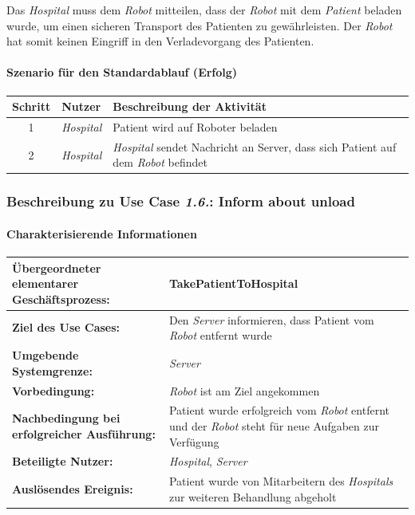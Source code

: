 				Das \emph{Hospital} muss dem \emph{Robot} mitteilen, dass der \emph{Robot} mit dem \emph{Patient} beladen wurde, um einen sicheren Transport des Patienten zu gewährleisten. 
				Der \emph{Robot} hat somit keinen Eingriff in den Verladevorgang des Patienten.
	
				\paragraph*{Szenario für den Standardablauf (Erfolg)}
	
				\begin{table}[H]
					\centering
					\begin{tabularx}{\textwidth}{|c|p{2cm}|X|}
					\hline
					Schritt & Nutzer & Beschreibung der Aktivität \\ \hline
					1 & \emph{Hospital} & Patient wird auf Roboter beladen \\
					2 & \emph{Hospital} & \emph{Hospital} sendet Nachricht an Server, dass sich Patient auf dem \emph{Robot} befindet \\
					\hline
					\end{tabularx}
				\end{table}
	
		
			\subsubsection{Beschreibung zu Use Case \emph{1.6.}: Inform about unload}
				\paragraph*{Charakterisierende Informationen}
				
				\begin{table}[H]
					\centering
					\begin{tabularx}{\textwidth}{|p{5cm}|X|}
						\hline
						\textbf{Übergeordneter elementarer Geschäftsprozess:} & TakePatientToHospital  \\ \hline
						\textbf{Ziel des Use Cases:} & Den \emph{Server} informieren, dass Patient vom \emph{Robot} entfernt wurde \\ \hline
						\textbf{Umgebende Systemgrenze:} & \emph{Server} \\ \hline
						\textbf{Vorbedingung:} & \emph{Robot} ist am Ziel angekommen \\ \hline
						\textbf{Nachbedingung bei erfolgreicher Ausführung:} & Patient wurde erfolgreich vom \emph{Robot} entfernt und der \emph{Robot} steht für neue Aufgaben zur Verfügung \\ \hline
						\textbf{Beteiligte Nutzer:} & \emph{Hospital}, \emph{Server} \\ \hline
						\textbf{Auslösendes Ereignis:} & Patient wurde von Mitarbeitern des \emph{Hospitals} zur weiteren Behandlung abgeholt \\
						\hline
					\end{tabularx}
				\end{table}
				
